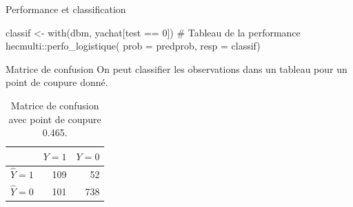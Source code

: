 \documentclass[
  ignorenonframetext,
]{beamer}
\newenvironment{Shaded}{\begin{snugshade}}{\end{snugshade}}
\newcommand{\AttributeTok}[1]{\textcolor[rgb]{0.40,0.45,0.13}{#1}}
\newcommand{\CommentTok}[1]{\textcolor[rgb]{0.37,0.37,0.37}{#1}}
\newcommand{\DecValTok}[1]{\textcolor[rgb]{0.68,0.00,0.00}{#1}}
\newcommand{\FunctionTok}[1]{\textcolor[rgb]{0.28,0.35,0.67}{#1}}
\newcommand{\NormalTok}[1]{\textcolor[rgb]{0.00,0.23,0.31}{#1}}
\newcommand{\OtherTok}[1]{\textcolor[rgb]{0.00,0.23,0.31}{#1}}
\newcommand{\SpecialCharTok}[1]{\textcolor[rgb]{0.37,0.37,0.37}{#1}}
\begin{document}
\begin{frame}[fragile]{Performance et classification}
\protect\hypertarget{performance-et-classification}{}
\begin{Shaded}
\begin{Highlighting}[numbers=left,,]
\NormalTok{classif }\OtherTok{\textless{}{-}} \FunctionTok{with}\NormalTok{(dbm, yachat[test }\SpecialCharTok{==} \DecValTok{0}\NormalTok{])}
\CommentTok{\# Tableau de la performance}
\NormalTok{hecmulti}\SpecialCharTok{::}\FunctionTok{perfo\_logistique}\NormalTok{(}
  \AttributeTok{prob =}\NormalTok{ predprob,}
  \AttributeTok{resp =}\NormalTok{ classif)}
\end{Highlighting}
\end{Shaded}
\end{frame}

\begin{frame}{Matrice de confusion}
\protect\hypertarget{matrice-de-confusion}{}
On peut classifier les observations dans un tableau pour un point de
coupure donné.

\hypertarget{tbl-confumat}{}
\begin{table}
\caption{\label{tbl-confumat}Matrice de confusion avec point de coupure 0.465. }\tabularnewline

\centering
\begin{tabular}{lrr}
\toprule
  & \(Y=1\) & \(Y=0\)\\
\midrule
\(\widehat{Y}=1\) & 109 & 52\\
\(\widehat{Y}=0\) & 101 & 738\\
\bottomrule
\end{tabular}
\end{table}
\end{frame}
\end{document}
